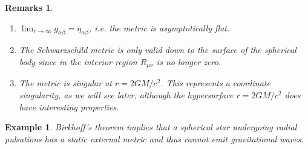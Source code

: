 \documentclass[a4paper]{article}
\newtheorem{eg}{Example}[section]
\newtheorem{remarks}{Remarks}[section]
\theoremstyle{new}
\begin{document}
\begin{remarks}\leavevmode
\begin{enumerate}
    \item $\lim_{r\rightarrow\infty}g_{\alpha\beta}=\eta_{\alpha\beta}$, i.e. the metric is asymptotically flat.
    \item The Schwarzschild metric is only valid down to the surface of the spherical body since in the interior region $R_{\mu\nu}$ is no longer zero.
    \item The metric is singular at $r=2GM/c^2$. This represents a coordinate singularity, as we will see later, although the hypersurface $r=2GM/c^2$ does have interesting properties.
\end{enumerate}
\end{remarks}
\begin{eg}
Birkhoff's theorem implies that a spherical star undergoing radial pulsations has a static external metric and thus cannot emit gravitational waves.
\end{eg}
\end{document}

